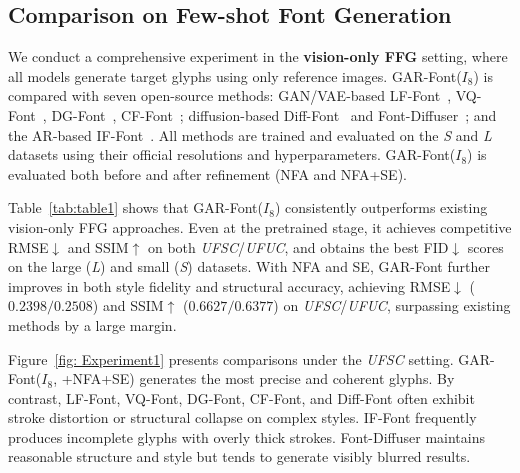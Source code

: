 
\subsection{Comparison on Few-shot Font Generation}
We conduct a comprehensive experiment in the \textbf{vision-only FFG} setting, where all models generate target glyphs using only reference images. GAR-Font($I_{8}$) is compared with seven open-source methods: GAN/VAE-based LF-Font~\cite{LF_Font}, VQ-Font~\cite{VQ_Font}, DG-Font~\cite{DG_Font}, CF-Font~\cite{CF_Font}; diffusion-based Diff-Font~\cite{Diff_Font} and Font-Diffuser~\cite{Font_Diffuser}; and the AR-based IF-Font~\cite{IF_Font}. All methods are trained and evaluated on the \textit{S} and \textit{L} datasets using their official resolutions and hyperparameters. GAR-Font($I_8$) is evaluated both before and after refinement (NFA and NFA+SE).

Table~\ref{tab:table1} shows that GAR-Font($I_{8}$) consistently outperforms existing vision-only FFG approaches. Even at the pretrained stage, it achieves competitive RMSE$\downarrow$ and SSIM$\uparrow$ on both \textit{UFSC}/\textit{UFUC}, and obtains the best FID$\downarrow$ scores on the large (\textit{L}) and small (\textit{S}) datasets. With NFA and SE, GAR-Font further improves in both style fidelity and structural accuracy, achieving RMSE$\downarrow$ ($0.2398/0.2508$) and SSIM$\uparrow$ ($0.6627/0.6377$) on \textit{UFSC}/\textit{UFUC}, surpassing existing methods by a large margin.

Figure~\ref{fig: Experiment1} presents comparisons under the \textit{UFSC} setting. GAR-Font($I_8$, +NFA+SE) generates the most precise and coherent glyphs. By contrast, LF-Font, VQ-Font, DG-Font, CF-Font, and Diff-Font often exhibit stroke distortion or structural collapse on complex styles. IF-Font frequently produces incomplete glyphs with overly thick strokes. Font-Diffuser maintains reasonable structure and style but tends to generate visibly blurred results.


